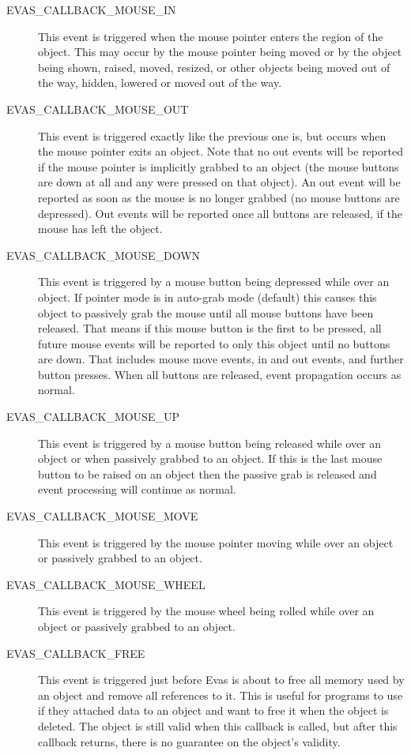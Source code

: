 \documentclass[a4paper]{profusion}
\begin{document}
\begin{description}
\item[EVAS\_CALLBACK\_MOUSE\_IN] This event is triggered when the
  mouse pointer enters the region of the object. This may occur by the
  mouse pointer being moved or by the object being shown, raised,
  moved, resized, or other objects being moved out of the way, hidden,
  lowered or moved out of the way.

\item[EVAS\_CALLBACK\_MOUSE\_OUT] This event is triggered exactly like
  the previous one is, but occurs when the mouse pointer
  exits an object.  Note that no out events will be reported if the
  mouse pointer is implicitly grabbed to an object (the mouse buttons
  are down at all and any were pressed on that object). An out event
  will be reported as soon as the mouse is no longer grabbed (no mouse
  buttons are depressed). Out events will be reported once all buttons
  are released, if the mouse has left the object.

\item[EVAS\_CALLBACK\_MOUSE\_DOWN] This event is triggered by a mouse
  button being depressed while over an object. If pointer mode is in
  auto-grab mode (default) this causes this object to passively grab
  the mouse until all mouse buttons have been released.  That means if
  this mouse button is the first to be pressed, all future mouse
  events will be reported to only this object until no buttons are
  down. That includes mouse move events, in and out events, and
  further button presses. When all buttons are released, event
  propagation occurs as normal.

\item[EVAS\_CALLBACK\_MOUSE\_UP] This event is triggered by a mouse
  button being released while over an object or when passively grabbed
  to an object. If this is the last mouse button to be raised on an
  object then the passive grab is released and event processing will
  continue as normal.

\item[EVAS\_CALLBACK\_MOUSE\_MOVE]This event is triggered by the mouse
  pointer moving while over an object or passively grabbed to an
  object.

\item[EVAS\_CALLBACK\_MOUSE\_WHEEL] This event is triggered by the
  mouse wheel being rolled while over an object or passively grabbed
  to an object.

\item[EVAS\_CALLBACK\_FREE] This event is triggered just before Evas
  is about to free all memory used by an object and remove all
  references to it. This is useful for programs to use if they
  attached data to an object and want to free it when the object is
  deleted. The object is still valid when this callback is called, but
  after this callback returns, there is no guarantee on the object's
  validity.


\end{description}
\end{document}
